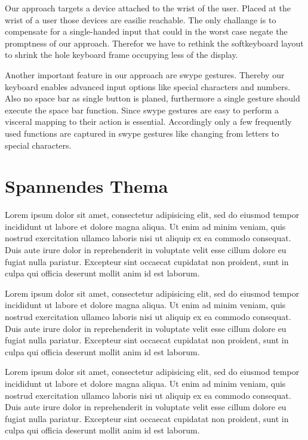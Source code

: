 \documentclass[10pt,a4paper,compsoc]{IEEEtran}
\begin{document}
Our approach targets a device attached to the wrist of the user. Placed at the wrist of a user those devices are easilie reachable. The only challange is to compensate for a single-handed input that could in the worst case negate the promptness of our approach. Therefor we have to rethink the softkeyboard layout to shrink the hole keyboard frame occupying less of the display.

Another important feature in our approach are swype gestures. Thereby our keyboard enables advanced input options like special characters and numbers. Also no space bar as single button is planed, furthermore a single gesture should execute the space bar function. Since swype gestures are easy to perform a visceral mapping to their action is essential. Accordingly only a few frequently used functions are captured in swype gestures like changing from letters to special characters. 

\section{Spannendes Thema}

Lorem ipsum dolor sit amet, consectetur adipisicing elit, sed do eiusmod tempor incididunt ut labore et dolore magna aliqua. Ut enim ad minim veniam, quis nostrud exercitation ullamco laboris nisi ut aliquip ex ea commodo consequat. Duis aute irure dolor in reprehenderit in voluptate velit esse cillum dolore eu fugiat nulla pariatur. Excepteur sint occaecat cupidatat non proident, sunt in culpa qui officia deserunt mollit anim id est laborum.

Lorem ipsum dolor sit amet, consectetur adipisicing elit, sed do eiusmod tempor incididunt ut labore et dolore magna aliqua. Ut enim ad minim veniam, quis nostrud exercitation ullamco laboris nisi ut aliquip ex ea commodo consequat. Duis aute irure dolor in reprehenderit in voluptate velit esse cillum dolore eu fugiat nulla pariatur. Excepteur sint occaecat cupidatat non proident, sunt in culpa qui officia deserunt mollit anim id est laborum.

Lorem ipsum dolor sit amet, consectetur adipisicing elit, sed do eiusmod tempor incididunt ut labore et dolore magna aliqua. Ut enim ad minim veniam, quis nostrud exercitation ullamco laboris nisi ut aliquip ex ea commodo consequat. Duis aute irure dolor in reprehenderit in voluptate velit esse cillum dolore eu fugiat nulla pariatur. Excepteur sint occaecat cupidatat non proident, sunt in culpa qui officia deserunt mollit anim id est laborum.



\end{document}
